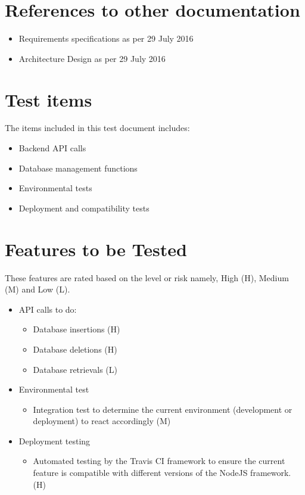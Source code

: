 \documentclass{article}
\begin{document}
\section{References to other documentation}
\begin{itemize}
	\item{Requirements specifications as per 29 July 2016}
	\item{Architecture Design as per 29 July 2016}
\end{itemize}

\section{Test items}
The items included in this test document includes:
\begin{itemize}
	\item Backend API calls
	\item Database management functions
	\item Environmental tests 
	\item Deployment and compatibility tests
\end{itemize} 

\section{Features to be Tested}
These features are rated based on the level or risk namely, High (H), Medium (M) and Low (L).

\begin{itemize}
\item API calls to do:
	\begin{itemize}
	\item Database insertions (H)
	\item Database deletions (H)
	\item Database retrievals (L)
	\end{itemize}
\item Environmental test
	\begin{itemize}
	\item Integration test to determine the current environment (development or deployment) to react accordingly (M)
	\end{itemize}
\item Deployment testing
		\begin{itemize}
	\item Automated testing by the Travis CI framework to ensure the current feature is compatible with different versions of the NodeJS framework. (H)
	\end{itemize}
\end{itemize}
\end{document}
